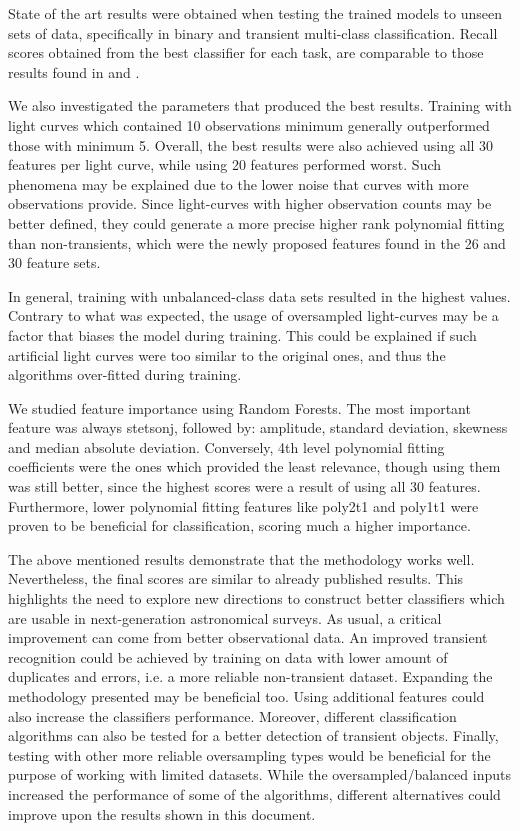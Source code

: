 \documentclass[a4paper,fleqn,usenatbib]{mnras}
\begin{document}
State of the art results were obtained when testing the trained models
to unseen sets of data, specifically in binary and transient
multi-class classification. 
Recall scores obtained from the best classifier for each task, are
comparable to those results found in \cite{1401.3211}
and \cite{1601.03931}.   


We also investigated the parameters that produced the best results.
Training with light curves which contained 10 observations minimum
generally outperformed those with minimum 5. 
Overall, the best results were also achieved using all 30 features per
light curve, while using 20 features performed worst. 
Such phenomena may be explained due to the lower noise that curves
with more observations provide.  
Since light-curves with higher observation counts may be better
defined, they could generate a more precise higher rank polynomial
fitting than non-transients, which were the newly proposed features
found in the 26 and 30 feature sets. 

In general, training with unbalanced-class data sets resulted in the
highest values. 
Contrary to what was expected, the usage of oversampled light-curves
may be a factor that biases the model during training. 
This could be explained if such artificial light curves were too
similar to the original ones, and thus the algorithms over-fitted
during training.  

We studied feature importance using Random Forests. 
The most important feature was always stetson\textunderscore j, followed by:
amplitude, standard deviation, skewness and median absolute
deviation. 
Conversely, 4th level polynomial fitting coefficients were
the ones which provided the least relevance, though using them was
still better, since the highest scores were a result of using all 30
features. 
Furthermore, lower polynomial fitting features like
poly2\textunderscore t1 and poly1\textunderscore t1 were proven to be
beneficial for classification, scoring much a higher importance. 

The above mentioned results demonstrate that the methodology works well.
Nevertheless, the final scores are similar to already published results.
This highlights the need to explore new directions to construct better
classifiers which are usable in next-generation astronomical surveys.   
As usual, a critical improvement can come from better observational
data.
An improved transient recognition could be achieved by training on
data with lower  amount of duplicates and errors, i.e. a more reliable
non-transient dataset.    
Expanding the methodology presented may be beneficial too. 
Using additional features could also increase the classifiers
performance. 
Moreover, different classification algorithms can also be tested for a
better detection of transient objects.  
Finally, testing with other more reliable oversampling types would be
beneficial for the purpose of working with limited datasets. 
While the oversampled/balanced inputs increased the performance of some of
the algorithms, different alternatives could improve upon the results
shown in this document.
\end{document}

